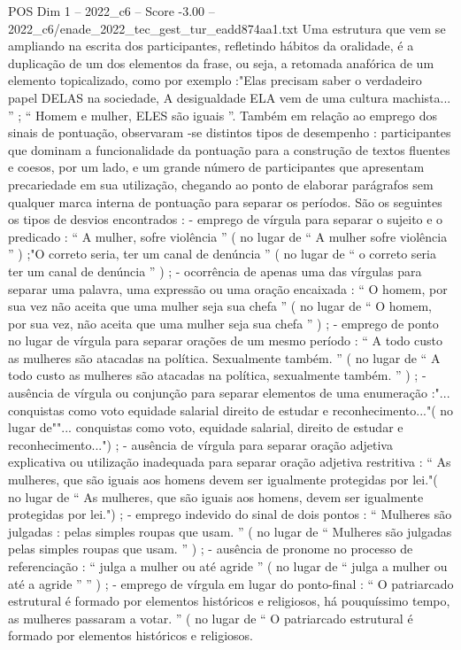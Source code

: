 \begin{textsample}{POS Dim 1 – 2022\_c6 – Score -3.00 – 2022\_c6/enade\_2022\_tec\_gest\_tur\_eadd874aa1.txt}
Uma estrutura que vem se ampliando na escrita dos participantes, refletindo hábitos da oralidade, é a duplicação de um dos elementos da frase, ou seja, a retomada anafórica de um elemento topicalizado, como por exemplo :"Elas precisam saber o verdadeiro papel DELAS na sociedade, A desigualdade ELA vem de uma cultura machista... ” ; “ Homem e mulher, ELES são iguais ”.
Também em relação ao emprego dos sinais de pontuação, observaram -se distintos tipos de desempenho : participantes que dominam a funcionalidade da pontuação para a construção de textos fluentes e coesos, por um lado, e um grande número de participantes que apresentam precariedade em sua utilização, chegando ao ponto de elaborar parágrafos sem qualquer marca interna de pontuação para separar os períodos.
São os seguintes os tipos de desvios encontrados : - emprego de vírgula para separar o sujeito e o predicado : “ A mulher, sofre violência ” ( no lugar de “ A mulher sofre violência ” ) ;"O correto seria, ter um canal de denúncia ” ( no lugar de “ o correto seria ter um canal de denúncia ” ) ; - ocorrência de apenas uma das vírgulas para separar uma palavra, uma expressão ou uma oração encaixada : “ O homem, por sua vez não aceita que uma mulher seja sua chefa ” ( no lugar de “ O homem, por sua vez, não aceita que uma mulher seja sua chefa ” ) ; - emprego de ponto no lugar de vírgula para separar orações de um mesmo período : “ A todo custo as mulheres são atacadas na política.
Sexualmente também. ” ( no lugar de “ A todo custo as mulheres são atacadas na política, sexualmente também. ” ) ; - ausência de vírgula ou conjunção para separar elementos de uma enumeração :"... conquistas como voto equidade salarial direito de estudar e reconhecimento..."( no lugar de""... conquistas como voto, equidade salarial, direito de estudar e reconhecimento...") ; - ausência de vírgula para separar oração adjetiva explicativa ou utilização inadequada para separar oração adjetiva restritiva : “ As mulheres, que são iguais aos homens devem ser igualmente protegidas por lei."( no lugar de “ As mulheres, que são iguais aos homens, devem ser igualmente protegidas por lei.") ; - emprego indevido do sinal de dois pontos : “ Mulheres são julgadas : pelas simples roupas que usam. ” ( no lugar de “ Mulheres são julgadas pelas simples roupas que usam. ” ) ; - ausência de pronome no processo de referenciação : “ julga a mulher ou até agride ” ( no lugar de “ julga a mulher ou até a agride ” ” ) ; - emprego de vírgula em lugar do ponto-final : “ O patriarcado estrutural é formado por elementos históricos e religiosos, há pouquíssimo tempo, as mulheres passaram a votar. ” ( no lugar de “ O patriarcado estrutural é formado por elementos históricos e religiosos.

\end{textsample}
